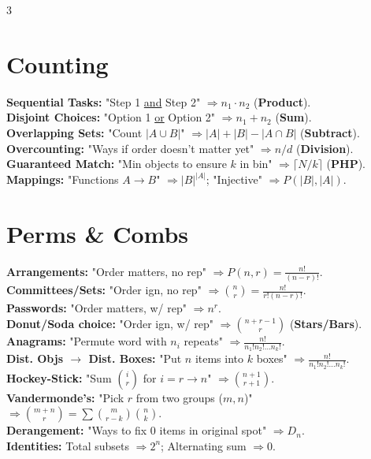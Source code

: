 \documentclass[10pt]{article}
\begin{document}
\begin{multicols}{3}
\section{Counting}
\textbf{Sequential Tasks:} "Step 1 \underline{and} Step 2" $\Rightarrow n_1 \cdot n_2$ (\textbf{Product}). \\
\textbf{Disjoint Choices:} "Option 1 \underline{or} Option 2" $\Rightarrow n_1 + n_2$ (\textbf{Sum}). \\
\textbf{Overlapping Sets:} "Count $|A \cup B|$" $\Rightarrow |A|+|B|-|A \cap B|$ (\textbf{Subtract}). \\
\textbf{Overcounting:} "Ways if order doesn't matter yet" $\Rightarrow n/d$ (\textbf{Division}). \\
\textbf{Guaranteed Match:} "Min objects to ensure $k$ in bin" $\Rightarrow \lceil N/k \rceil$ (\textbf{PHP}). \\
\textbf{Mappings:} "Functions $A \to B$" $\Rightarrow |B|^{|A|}$; "Injective" $\Rightarrow P(|B|, |A|)$.

\section{Perms \& Combs}
\textbf{Arrangements:} "Order matters, no rep" $\Rightarrow P(n,r) = \frac{n!}{(n-r)!}$. \\
\textbf{Committees/Sets:} "Order ign, no rep" $\Rightarrow \binom{n}{r} = \frac{n!}{r!(n-r)!}$. \\
\textbf{Passwords:} "Order matters, w/ rep" $\Rightarrow n^r$. \\
\textbf{Donut/Soda choice:} "Order ign, w/ rep" $\Rightarrow \binom{n+r-1}{r}$ (\textbf{Stars/Bars}). \\
\textbf{Anagrams:} "Permute word with $n_i$ repeats" $\Rightarrow \frac{n!}{n_1!n_2!\dots n_k!}$. \\
\textbf{Dist. Objs $\to$ Dist. Boxes:} "Put $n$ items into $k$ boxes" $\Rightarrow \frac{n!}{n_1!n_2!\dots n_k!}$. \\
\textbf{Hockey-Stick:} "Sum $\binom{i}{r}$ for $i=r \to n$" $\Rightarrow \binom{n+1}{r+1}$. \\
\textbf{Vandermonde's:} "Pick $r$ from two groups ($m, n$)" $\Rightarrow \binom{m+n}{r} = \sum \binom{m}{r-k}\binom{n}{k}$. \\
\textbf{Derangement:} "Ways to fix 0 items in original spot" $\Rightarrow D_n$. \\
\textbf{Identities:} Total subsets $\Rightarrow 2^n$; Alternating sum $\Rightarrow 0$.


\end{multicols}
\end{document}

